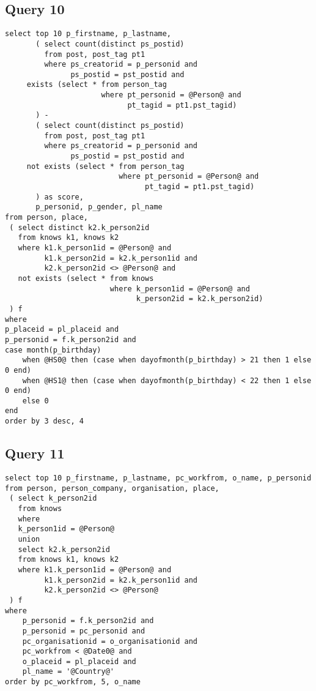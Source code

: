 \subsection{Query 10}
{\footnotesize
\begin{verbatim}
select top 10 p_firstname, p_lastname,
       ( select count(distinct ps_postid)
         from post, post_tag pt1
         where ps_creatorid = p_personid and
               ps_postid = pst_postid and
     exists (select * from person_tag
                      where pt_personid = @Person@ and 
                            pt_tagid = pt1.pst_tagid)
       ) -
       ( select count(distinct ps_postid)
         from post, post_tag pt1
         where ps_creatorid = p_personid and 
               ps_postid = pst_postid and
     not exists (select * from person_tag 
                          where pt_personid = @Person@ and 
                                pt_tagid = pt1.pst_tagid)
       ) as score,
       p_personid, p_gender, pl_name
from person, place,
 ( select distinct k2.k_person2id
   from knows k1, knows k2
   where k1.k_person1id = @Person@ and 
         k1.k_person2id = k2.k_person1id and 
         k2.k_person2id <> @Person@ and
   not exists (select * from knows 
                        where k_person1id = @Person@ and 
                              k_person2id = k2.k_person2id)
 ) f
where
p_placeid = pl_placeid and
p_personid = f.k_person2id and
case month(p_birthday) 
    when @HS0@ then (case when dayofmonth(p_birthday) > 21 then 1 else 0 end)
    when @HS1@ then (case when dayofmonth(p_birthday) < 22 then 1 else 0 end)
    else 0
end
order by 3 desc, 4
\end{verbatim}
}


 

\subsection{Query 11}

{\footnotesize
\begin{verbatim}
select top 10 p_firstname, p_lastname, pc_workfrom, o_name, p_personid
from person, person_company, organisation, place,
 ( select k_person2id
   from knows
   where
   k_person1id = @Person@
   union
   select k2.k_person2id
   from knows k1, knows k2
   where k1.k_person1id = @Person@ and 
         k1.k_person2id = k2.k_person1id and 
         k2.k_person2id <> @Person@
 ) f
where
    p_personid = f.k_person2id and
    p_personid = pc_personid and
    pc_organisationid = o_organisationid and
    pc_workfrom < @Date0@ and
    o_placeid = pl_placeid and
    pl_name = '@Country@'
order by pc_workfrom, 5, o_name
\end{verbatim}
}


